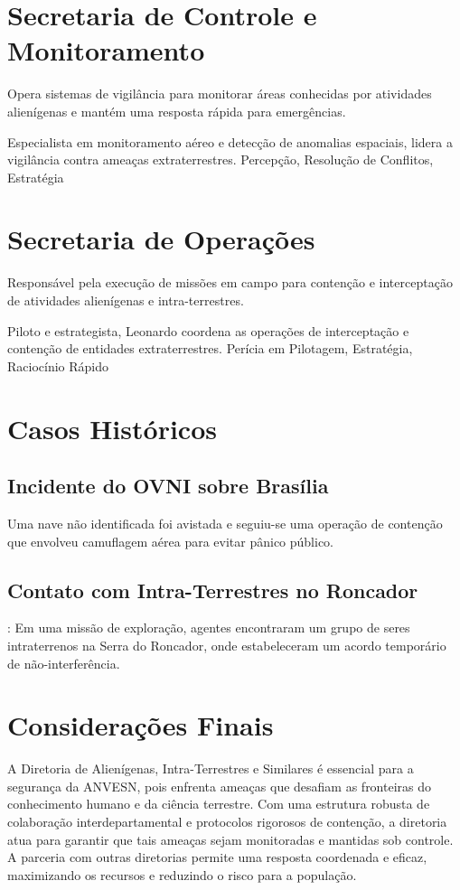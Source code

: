 \section{Secretaria de Controle e Monitoramento}
Opera sistemas de vigilância para monitorar áreas conhecidas por atividades alienígenas e mantém uma resposta rápida para emergências.

{Especialista em monitoramento aéreo e detecção de anomalias espaciais, lidera a vigilância contra ameaças extraterrestres.}
{Percepção, Resolução de Conflitos, Estratégia}

\section{Secretaria de Operações}
Responsável pela execução de missões em campo para contenção e interceptação de atividades alienígenas e intra-terrestres.

{Piloto e estrategista, Leonardo coordena as operações de interceptação e contenção de entidades extraterrestres.}
{Perícia em Pilotagem, Estratégia, Raciocínio Rápido}
\section{Casos Históricos}
\subsection{Incidente do OVNI sobre Brasília} Uma nave não identificada foi avistada e seguiu-se uma operação de contenção que envolveu camuflagem aérea para evitar pânico público.

\subsection{Contato com Intra-Terrestres no Roncador}: Em uma missão de exploração, agentes encontraram um grupo de seres intraterrenos na Serra do Roncador, onde estabeleceram um acordo temporário de não-interferência.

\section{Considerações Finais}

A Diretoria de Alienígenas, Intra-Terrestres e Similares é essencial para a segurança da ANVESN, pois enfrenta ameaças que desafiam as fronteiras do conhecimento humano e da ciência terrestre. Com uma estrutura robusta de colaboração interdepartamental e protocolos rigorosos de contenção, a diretoria atua para garantir que tais ameaças sejam monitoradas e mantidas sob controle. A parceria com outras diretorias permite uma resposta coordenada e eficaz, maximizando os recursos e reduzindo o risco para a população.


